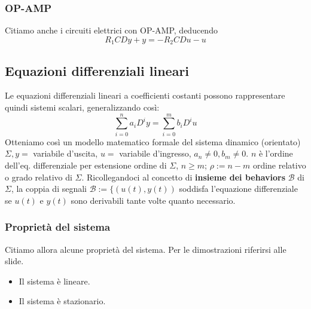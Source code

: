\documentclass[11pt]{article}
\begin{document}
\subsubsection{OP-AMP}
Citiamo anche i circuiti elettrici con OP-AMP, deducendo 
\begin{displaymath}
    R_1CDy + y = -R_2CDu-u
\end{displaymath}
\subsection{Equazioni differenziali lineari}
Le equazioni differenziali lineari a coefficienti costanti possono rappresentare quindi sistemi scalari, generalizzando così:
\begin{displaymath}
    \sum_{i=0}^n a_i D^i y = \sum_{i=0}^m b_i D^i u
\end{displaymath}
Otteniamo così un modello matematico formale del sistema dinamico (orientato) $\Sigma, y =$ variabile d'uscita, $u=$ variabile d'ingresso, $a_n \neq 0, b_m \neq 0$. $n$ è l'ordine dell'eq. differenziale per estensione ordine di $\Sigma$, $n\ge m$; $\rho := n-m$ ordine relativo o grado relativo di $\Sigma$.
Ricollegandoci al concetto di \textbf{insieme dei behaviors} $\mathcal{B}$ di $\Sigma$, la coppia di segnali $\mathcal{B} := \{\left(u(t), y(t)\right)$ soddisfa l'equazione differenziale se $u(t)$ e $y(t)$ sono derivabili tante volte quanto necessario. 
\subsubsection{Proprietà del sistema}
Citiamo allora alcune proprietà del sistema. Per le dimostrazioni riferirsi alle slide.
\begin{itemize}
    \item Il sistema è lineare.
    \item Il sistema è stazionario.
\end{itemize}
\end{document}
